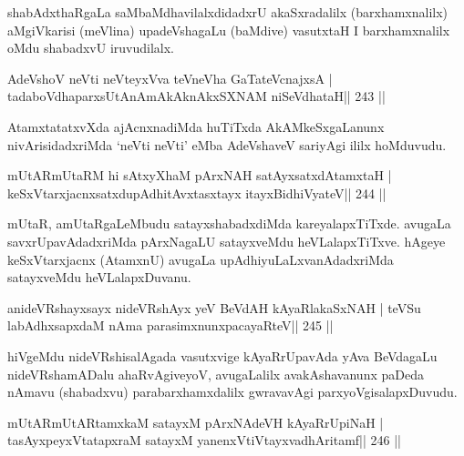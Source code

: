 \begin{artha}
shabAdxthaRgaLa saMbaMdhavilalxdidadxrU akaSxradalilx (barxhamxnalilx) aMgiVkarisi (meVlina) upadeVshagaLu (baMdive) vasutxtaH I barxhamxnalilx oMdu shabadxvU iruvudilalx.
\end{artha}


\begin{shl}
AdeVshoV neVti neVteyxVva teVneVha GaTateV\s cnajxsA |
tadaboVdhaparxsUtAnAmAkAknAkxSXNAM niSeVdhataH\hfill || 243 ||
\end{shl}

\begin{artha}
AtamxtatatxvXda ajAcnxnadiMda huTiTxda AkAMkeSxgaLanunx nivArisidadxriMda `neVti neVti' eMba AdeVshaveV sariyAgi ililx hoMduvudu.
\end{artha}


\begin{shl}
mUtARmUtaRM hi sAtxyXhaM pArxNAH satAyxsatxdAtamxtaH |
keSxVtarxjacnxsatxdupAdhitAvxtasxtayx itayxBidhiVyateV\hfill || 244 ||
\end{shl}

\begin{artha}
mUtaR, amUtaRgaLeMbudu satayxshabadxdiMda kareyalapxTiTxde. avugaLa savxrUpavAdadxriMda pArxNagaLU satayxveMdu heVLalapxTiTxve. hAgeye keSxVtarxjacnx (AtamxnU) avugaLa upAdhiyuLaLxvanAdadxriMda satayxveMdu heVLalapxDuvanu.
\end{artha}

\begin{shl}
anideVRshayxsayx nideVRshAyx yeV BeVdAH kAyaRlakaSxNAH |
teVSu labAdhxsapxdaM nAma parasimxnunxpacayaRteV\hfill || 245 ||
\end{shl}

\begin{artha}
hiVgeMdu nideVRshisalAgada vasutxvige kAyaRrUpavAda yAva BeVdagaLu nideVRshamADalu ahaRvAgiveyoV, avugaLalilx avakAshavanunx paDeda nAmavu (shabadxvu) parabarxhamxdalilx gwravavAgi parxyoVgisalapxDuvudu.
\end{artha}

\begin{shl}
mUtARmUtARtamxkaM satayxM pArxNAdeVH kAyaRrUpiNaH |
tasAyxpeyxVtatapxraM satayxM yanenxVtiVtayxvadhAritamf\hfill || 246 ||
\end{shl}

